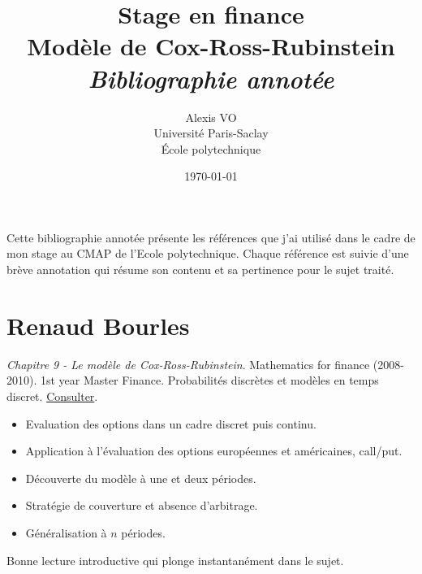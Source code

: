 \documentclass[a4paper,10pt]{article}
\title{\Huge{\textbf{Stage en finance\\ Modèle de Cox-Ross-Rubinstein}}\\ \medskip
      \Huge{\textit{Bibliographie annotée}}\vspace*{0.7cm}}
\author{\LARGE{Alexis VO}\vspace{1cm}\\ \medskip
      Université Paris-Saclay\\École polytechnique}
\date{\vspace{0.2cm}\today}
\begin{document}
\vspace{\fill}
  \maketitle
\vspace{\fill}

\newpage

Cette bibliographie annotée présente les références que j'ai utilisé dans le cadre de mon stage au CMAP de l'Ecole polytechnique. Chaque référence est suivie d'une brève annotation qui résume son contenu et sa pertinence pour le sujet traité.\\ \medskip

\begin{center}
    \tableofcontents    
\end{center}

\newpage

\vspace{1em}

\section*{Renaud Bourles\quad}
{}

\textit{Chapitre 9 - Le modèle de Cox-Ross-Rubinstein}. Mathematics for finance (2008-2010). 1st year Master Finance. Probabilités discrètes et modèles en temps discret. \href{http://renaud.bourles.perso.centrale-med.fr/MathsFi/Chap%209%20-%20Le%20modele%20Cox-Ross-Rubinstein.pdf}{Consulter}.
\begin{itemize}
    \item Evaluation des options dans un cadre discret puis continu.
    \item Application à l'évaluation des options européennes et américaines, call/put.
    \item Découverte du modèle à une et deux périodes.
    \item Stratégie de couverture et absence d'arbitrage.
    \item Généralisation à $n$ périodes.
\end{itemize}
Bonne lecture introductive qui plonge instantanément dans le sujet.\\ 

\vspace{1em}
\end{document}
